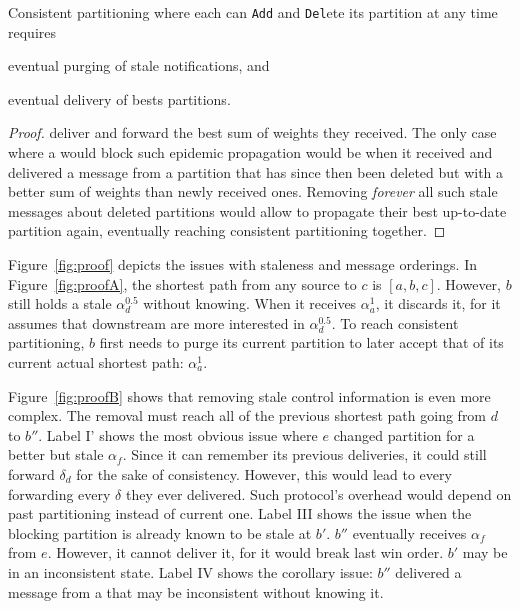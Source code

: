 
\begin{corollary}
  Consistent partitioning where each \process can \texttt{Add} and
  \texttt{Del}ete its partition at any time requires
  \begin{inparaenum}[(i)]
  \item eventual purging of stale notifications, and
  \item eventual delivery of bests partitions.
  \end{inparaenum}
\end{corollary}

\begin{proof}
  \Processes deliver and forward the best sum of weights they
  received. The only case where a \process would block such epidemic
  propagation would be when it received and delivered a message from a
  partition that has since then been deleted but with a better sum of
  weights than newly received ones. Removing \emph{forever} all such
  stale messages about deleted partitions would allow \processes to
  propagate their best up-to-date partition again, eventually reaching
  consistent partitioning together.
\end{proof}



Figure~\ref{fig:proof} depicts the issues with staleness and message
orderings. In Figure~\ref{fig:proofA}, the shortest path from any
source to \Process $c$ is $[a, b, c]$. However, \Process $b$ still holds
a stale $\alpha_d^{0.5}$ without knowing. When it receives
$\alpha_a^1$, it discards it, for it assumes that downstream \processes
are more interested in $\alpha_d^{0.5}$. To reach consistent
partitioning, \Process $b$ first needs to purge its current partition
to later accept that of its current actual shortest path:
$\alpha_a^1$.

\noindent Figure~\ref{fig:proofB} shows that removing stale control
information is even more complex. The removal must reach all \processes
of the previous shortest path going from $d$ to $b''$. Label I' shows
the most obvious issue where \Process $e$ changed partition for a
better but stale $\alpha_f$. Since it can remember its previous
deliveries, it could still forward $\delta_d$ for the sake of
consistency. However, this would lead to every \process forwarding
every $\delta$ they ever delivered. Such protocol's overhead would
depend on past partitioning instead of current one. Label III shows
the issue when the blocking partition is already known to be stale at
\Process $b'$. \Process $b''$ eventually receives $\alpha_f$ from
$e$. However, it cannot deliver it, for it would break last win order.
\Process $b'$ may be in an inconsistent state. Label IV shows the
corollary issue: \Process $b''$ delivered a message from a \process that
may be inconsistent without knowing it.


